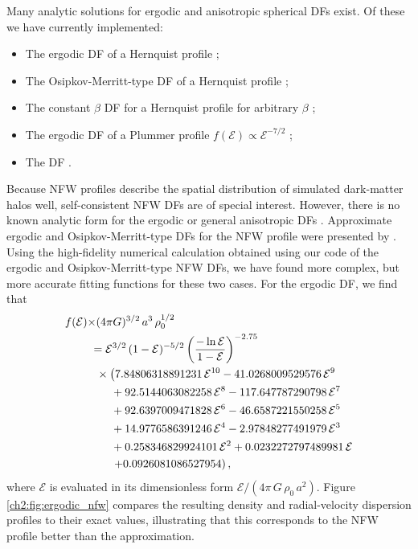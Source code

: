 Many analytic solutions for ergodic and anisotropic spherical DFs exist. Of these we have currently implemented:
\begin{itemize}
    \item The ergodic DF of a Hernquist profile \parencite{hernquist90};
    \item The Osipkov-Merritt-type DF of a Hernquist profile \parencite{hernquist90};
    \item The constant $\beta$ DF for a Hernquist profile for arbitrary $\beta$ \parencite{baes02};
    \item The ergodic DF of a Plummer profile $f(\mathcal{E}) \propto \mathcal{E}^{-7/2}$ \parencite[e.g.,][]{binney08};
    \item The \textcite{king66} DF \parencite[e.g.][]{michie63}.
\end{itemize}

Because NFW profiles describe the spatial distribution of simulated dark-matter halos well, self-consistent NFW DFs are of special interest. However, there is no known analytic form for the ergodic or general anisotropic DFs \parencite[however, see][for a notable exception, the DF with constant $\beta=1/2$]{evans06}. Approximate ergodic and Osipkov-Merritt-type DFs for the NFW profile were presented by \textcite{widrow00}. Using the high-fidelity numerical calculation obtained using our code of the ergodic and Osipkov-Merritt-type NFW DFs, we have found more complex, but more accurate fitting functions for these two cases. For the ergodic DF, we find that
\begin{equation}
\begin{split}\label{ch2:eq-nfw-ergodic-newform}
    f(\mathcal{E})\times&(4\pi G)^{3/2}\,a^3\,\rho_0^{1/2} \\&\!\!\!= \mathcal{E}^{3/2} \,(1-\mathcal{E})^{-5/2}\left({-\ln \mathcal{E} \over 1-\mathcal{E}}\right)^{-2.75}\\& \times \left(7.84806318891231\, \mathcal{E}^{10} - 41.0268009529576\, \mathcal{E}^{9}\right.\\& \quad\ + 92.5144063082258\, \mathcal{E}^{8} - 117.647787290798\, \mathcal{E}^{7}\\&\quad\ + 92.6397009471828\, \mathcal{E}^{6} - 46.6587221550258\, \mathcal{E}^{5}\\&\quad\ + 14.9776586391246\, \mathcal{E}^{4} - 2.97848277491979\, \mathcal{E}^{3}\\&\quad\ + 0.258346829924101\, \mathcal{E}^{2} + 0.0232272797489981\, \mathcal{E}\\&\left. \quad\ + 0.0926081086527954\right),
\end{split}
\end{equation}
where $\mathcal{E}$ is evaluated in its dimensionless form $\mathcal{E}/(4\pi\,G\,\rho_0\,a^2)$.
Figure \ref{ch2:fig:ergodic_nfw} compares the resulting density and radial-velocity dispersion profiles to their exact values, illustrating that this corresponds to the NFW profile better than the \textcite{widrow00} approximation.

